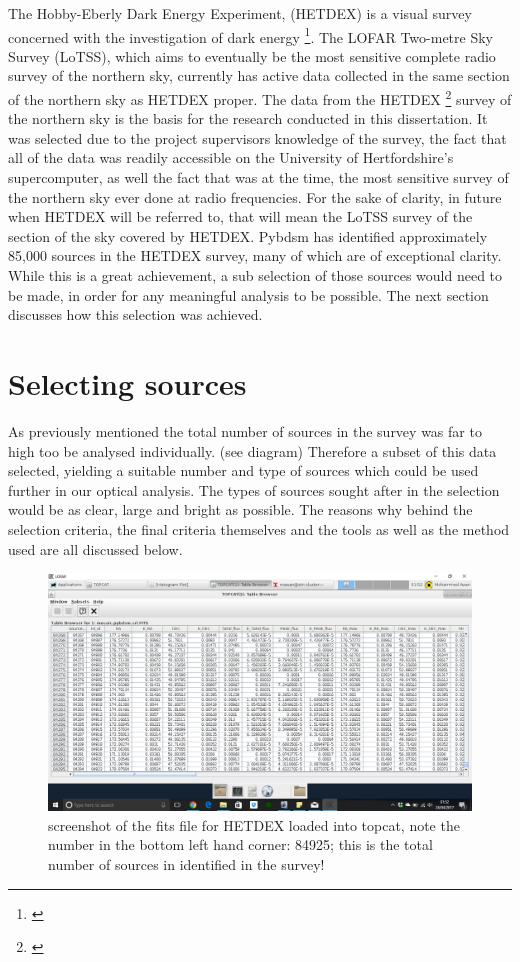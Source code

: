 \documentclass{article}
\begin{document}
The Hobby-Eberly Dark Energy Experiment, (HETDEX) is a visual survey concerned with the investigation of dark energy \footnote{\cite{HETDEX}}. The LOFAR Two-metre Sky Survey (LoTSS), which aims to eventually be the most sensitive complete radio survey of the northern sky, currently has active data collected in the same section of the northern sky as HETDEX proper. The data from the HETDEX \footnote{\cite{lofar2}} survey of the northern sky is the basis for the research conducted in this dissertation. It was selected due to the project supervisors knowledge of the survey, the fact that all of the data was readily accessible on the University of Hertfordshire's supercomputer, as well the fact that was at the time, the most sensitive survey of the northern sky ever done at radio frequencies. For the sake of clarity, in future when HETDEX will be referred to, that will mean the LoTSS survey of the section of the sky covered by HETDEX. Pybdsm has identified approximately 85,000 sources in the HETDEX survey, many of which are of exceptional clarity. While this is a great achievement, a sub selection of those sources would need to be made, in order for any meaningful analysis to be possible. The next section discusses how this selection was achieved.
\newpage

\section{Selecting sources}
As previously mentioned the total number of sources in the survey was far to high too be analysed individually. (see diagram) Therefore a subset of this data selected, yielding a suitable number and type of sources which could be used further in our optical analysis. The types of sources sought after in the selection would be as clear, large and bright as possible. The reasons why behind the selection criteria, the final criteria themselves and the tools as well as the method used are all discussed below.

\begin{figure}
    \centering
    \includegraphics[scale = 0.3]{mdata.png}
    \caption{screenshot of the fits file for HETDEX loaded into topcat, note the number in the bottom left hand corner: 84925; this is the total number of sources in identified in the survey!}
\end{figure}
\end{document}
